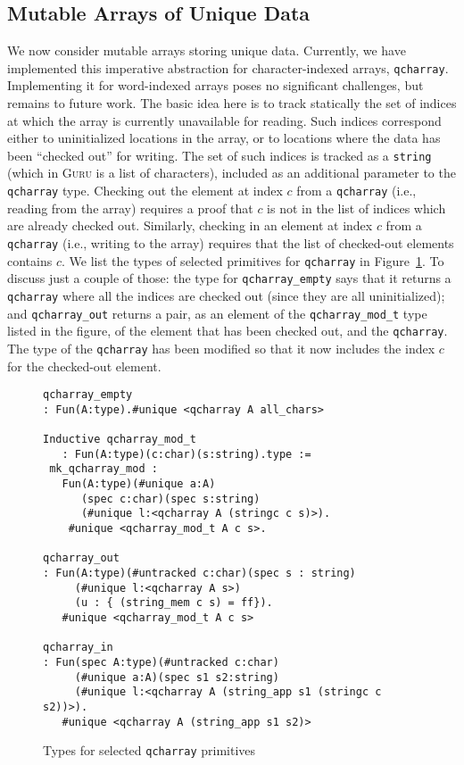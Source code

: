 \documentclass[9pt,natbib]{sigplanconf}
\begin{document}
\subsection{Mutable Arrays of Unique Data}

We now consider mutable arrays storing unique data.  Currently, we
have implemented this imperative abstraction for character-indexed
arrays, \texttt{qcharray}.  Implementing it for word-indexed arrays
poses no significant challenges, but remains to future work.  The
basic idea here is to track statically the set of indices at which the
array is currently unavailable for reading.  Such indices correspond
either to uninitialized locations in the array, or to locations where
the data has been ``checked out'' for writing.  The set of such
indices is tracked as a \texttt{string} (which in \textsc{Guru} is a
list of characters), included as an additional parameter to the
\texttt{qcharray} type. Checking out the element at index $c$ from a
\texttt{qcharray} (i.e., reading from the array) requires a proof that
$c$ is not in the list of indices which are already checked out.
Similarly, checking in an element at index $c$ from a
\texttt{qcharray} (i.e., writing to the array) requires that the list
of checked-out elements contains $c$.  We list the types of selected
primitives for \texttt{qcharray} in Figure~\ref{fig:qcharray}.  To
discuss just a couple of those: the type for \texttt{qcharray\_empty}
says that it returns a \texttt{qcharray} where all the indices are
checked out (since they are all uninitialized); and
\texttt{qcharray\_out} returns a pair, as an element of the
\texttt{qcharray\_mod\_t} type listed in the figure, of the element
that has been checked out, and the \texttt{qcharray}.  The type of the
\texttt{qcharray} has been modified so that it now includes the index
$c$ for the checked-out element.

\begin{figure}
\small
\begin{verbatim}
qcharray_empty 
: Fun(A:type).#unique <qcharray A all_chars>

Inductive qcharray_mod_t
   : Fun(A:type)(c:char)(s:string).type :=
 mk_qcharray_mod : 
   Fun(A:type)(#unique a:A)
      (spec c:char)(spec s:string)
      (#unique l:<qcharray A (stringc c s)>).
    #unique <qcharray_mod_t A c s>.

qcharray_out 
: Fun(A:type)(#untracked c:char)(spec s : string)
     (#unique l:<qcharray A s>)
     (u : { (string_mem c s) = ff}).
   #unique <qcharray_mod_t A c s>

qcharray_in
: Fun(spec A:type)(#untracked c:char)
     (#unique a:A)(spec s1 s2:string)
     (#unique l:<qcharray A (string_app s1 (stringc c s2))>). 
   #unique <qcharray A (string_app s1 s2)>
\end{verbatim}
\caption{Types for selected \texttt{qcharray} primitives}
\label{fig:qcharray}
\end{figure}
\end{document}
